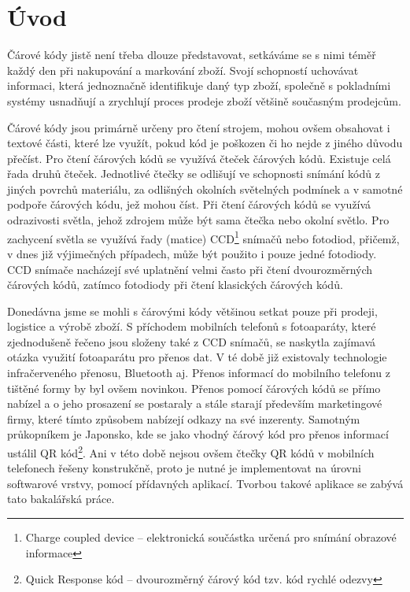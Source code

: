 
\chapter{Úvod}
Čárové kódy jistě není třeba dlouze představovat, setkáváme se s nimi téměř
každý den při nakupování a markování zboží. Svojí schopností uchovávat
informaci, která jednoznačně identifikuje daný typ zboží, společně s 
pokladními systémy usnadňují a zrychlují proces prodeje zboží většině současným
prodejcům.

Čárové kódy jsou primárně určeny pro čtení strojem, mohou ovšem obsahovat i 
textové části, které lze využít, pokud kód je poškozen či ho nejde z jiného
důvodu  přečíst. Pro čtení čárových kódů se využívá čteček čárových kódů. 
Existuje celá řada druhů čteček. Jednotlivé čtečky se odlišují ve schopnosti 
snímání kódů z jiných povrchů materiálu, za odlišných okolních světelných 
podmínek a v samotné podpoře čárových kódu, jež mohou číst. Při čtení čárových 
kódů se využívá odrazivosti světla, jehož zdrojem může být sama čtečka nebo 
okolní světlo. Pro zachycení světla se využívá řady (matice) CCD\footnote{Charge 
coupled device -- elektronická součástka určená pro snímání obrazové informace}
snímačů nebo fotodiod, přičemž, v dnes již výjimečných případech, může být použito i pouze 
jedné fotodiody. CCD snímače nacházejí své uplatnění velmi často při čtení 
dvourozměrných čárových kódů, zatímco fotodiody při čtení klasických čárových 
kódů. \cite{barcodeScanner}

Donedávna jsme se mohli s čárovými kódy většinou setkat pouze při prodeji, 
logistice a výrobě zboží. S příchodem mobilních telefonů s fotoaparáty, které 
zjednodušeně řečeno jsou složeny také z CCD snímačů, se naskytla zajímavá 
otázka využití fotoaparátu pro přenos dat. V té době již existovaly technologie 
infračerveného přenosu, Bluetooth aj. Přenos informací do mobilního telefonu z 
tištěné formy by byl ovšem novinkou. Přenos pomocí čárových kódů se přímo 
nabízel a o jeho prosazení se postaraly a stále starají především marketingové 
firmy, které tímto způsobem nabízejí odkazy na své inzerenty. Samotným 
průkopníkem je Japonsko, kde se jako vhodný čárový kód pro přenos informací 
ustálil QR kód\footnote{Quick Response kód -- dvourozměrný čárový kód
tzv. kód rychlé odezvy}. Ani v této době nejsou
ovšem čtečky QR kódů v mobilních telefonech řešeny konstrukčně, proto je nutné je implementovat na úrovni 
softwarové vrstvy, pomocí přídavných aplikací. Tvorbou takové aplikace se 
zabývá tato bakalářská práce.

